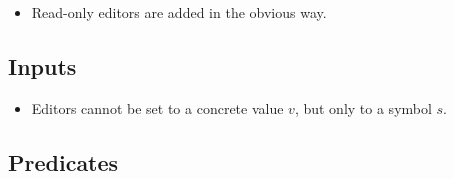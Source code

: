 
\begin{itemize}
  \item Read-only editors are added in the obvious way.
\end{itemize}



\subsection{Inputs}


\begin{itemize}
  \item Editors cannot be set to a concrete value $v$, but only to a symbol $s$.
\end{itemize}



\subsection{Predicates}

